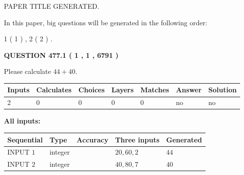 \documentclass[12pt]{article}
\begin{document}
   
\vspace{0.2in}
   
   
   
   
   
   
   
   
 \vspace{0.2in}
 
 
 
 
   
   
 PAPER TITLE GENERATED.
   
   
   
\vspace{0.2in}
   
In this paper, big questions will be generated in the following order: 
   
   
   1 ( 1 )
 ,
   2 ( 2 )
 .
  
\vspace{0.2in}
  
{\textbf{\Large{QUESTION
477.1 
 ( 1 , 1 , 6791 )
}}}
  
  
 
Please calculate $ %
44 +  %
40 $.
 
 
   
   
   
   
\noindent\begin{tabular}{|l|l|l|l|l|l|l|}
 \hline
Inputs & Calculates & Choices & Layers & Matches & Answer & Solution \\ \hline
 2  & 
 0  & 
 0
  & 
 0  & 
 0  & 
  no & 
  no 
  \\ \hline
 \end{tabular}
   
   
   
   
\noindent{}
   
   
   
   
\noindent\vspace{0.1in}\hspace{-0.08in} {\textbf{\Large{All inputs: }}}
   
   
  
  
\noindent\begin{tabular}{|l|l|l|l|l|}
\hline
 Sequential & Type & Accuracy & Three inputs & Generated \\ 
\hline
 
 
  INPUT $  1 $ & integer &  & $
 20
 , 
 60
 , 
 2
 $ & $ 44 $ 
 \\  \hline  
 
 
  INPUT $  2 $ & integer &  & $
 40
 , 
 80
 , 
 7
 $ & $ 40 $ 
 \\  \hline  
 \end{tabular}
   
\end{document}
